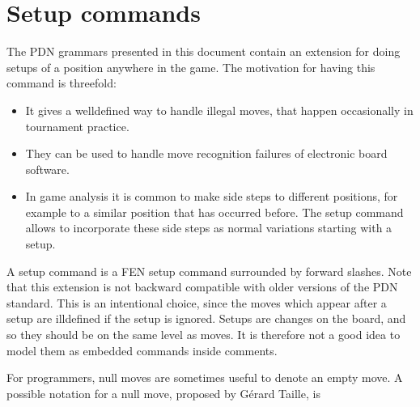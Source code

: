 \documentclass[letterpaper,10pt,english]{sphinxmanual}
\begin{document}
\section{Setup commands}
\label{\detokenize{extensions:setup-commands}}
\sphinxAtStartPar
The PDN grammars presented in this document contain an extension for doing
setups of a position anywhere in the game. The motivation for having this
command is threefold:
\begin{itemize}
\item {} 
\sphinxAtStartPar
It gives a well\sphinxhyphen{}defined way to handle illegal moves, that happen occasionally
in tournament practice.

\item {} 
\sphinxAtStartPar
They can be used to handle move recognition failures of electronic board
software.

\item {} 
\sphinxAtStartPar
In game analysis it is common to make side steps to different positions,
for example to a similar position that has occurred before. The setup
command allows to incorporate these side steps as normal variations
starting with a setup.

\end{itemize}

\sphinxAtStartPar
A setup command is a FEN setup command surrounded by forward slashes.
Note that this extension is not backward compatible with older versions
of the PDN standard. This is an intentional choice, since the moves which
appear after a setup are ill\sphinxhyphen{}defined if the setup is ignored. Setups are changes
on the board, and so they should be on the same level as moves. It is therefore
not a good idea to model them as embedded commands inside comments.

\sphinxAtStartPar
{}

\sphinxAtStartPar
For programmers, null moves are sometimes useful to denote an empty move.
A possible notation for a null move, proposed by Gérard Taille, is

\begin{sphinxVerbatim}[commandchars=\\\{\}]
 
\end{sphinxVerbatim}

\sphinxAtStartPar
{}

\begin{sphinxVerbatim}[commandchars=\\\{\}]
   
           
\end{sphinxVerbatim}
\end{document}
